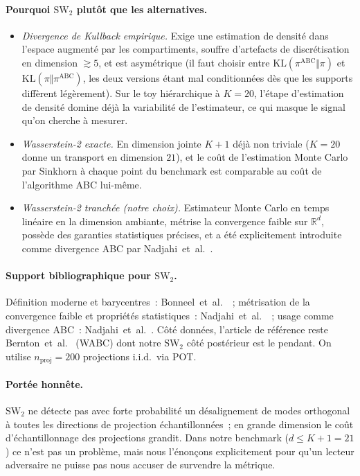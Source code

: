 \documentclass[11pt]{article}
\begin{document}
\paragraph{Pourquoi $\mathrm{SW}_2$ plutôt que les alternatives.}
\begin{itemize}[nosep]
    \item \emph{Divergence de Kullback empirique.} Exige une estimation de densité dans l'espace
    augmenté par les compartiments, souffre d'artefacts de discrétisation en dimension
    $\gtrsim 5$, et est asymétrique (il faut choisir entre $\mathrm{KL}(\pi^{\mathrm{ABC}}\Vert\pi)$
    et $\mathrm{KL}(\pi\Vert\pi^{\mathrm{ABC}})$, les deux versions étant mal conditionnées dès
    que les supports diffèrent légèrement). Sur le toy hiérarchique à $K=20$, l'étape
    d'estimation de densité domine déjà la variabilité de l'estimateur, ce qui masque le signal
    qu'on cherche à mesurer.
    \item \emph{Wasserstein-2 exacte.} En dimension jointe $K+1$ déjà non triviale ($K=20$ donne
    un transport en dimension $21$), et le coût de l'estimation Monte Carlo par Sinkhorn à chaque
    point du benchmark est comparable au coût de l'algorithme ABC lui-même.
    \item \emph{Wasserstein-2 tranchée (notre choix).} Estimateur Monte Carlo en temps linéaire
    en la dimension ambiante, métrise la convergence faible sur $\mathbb R^{d}$, possède des
    garanties statistiques précises, et a été explicitement introduite comme divergence ABC par
    Nadjahi~et~al.~\cite{nadjahi2020approximate}.
\end{itemize}

\paragraph{Support bibliographique pour $\mathrm{SW}_2$.} Définition moderne et barycentres~:
Bonneel~et~al.~\cite{bonneel2015sliced}~; métrisation de la convergence faible et propriétés
statistiques~: Nadjahi~et~al.~\cite{nadjahi2020statistical}~; usage comme divergence ABC~:
Nadjahi~et~al.~\cite{nadjahi2020approximate}. Côté données, l'article de référence reste
Bernton~et~al.~\cite{bernton2019approximate} (WABC) dont notre $\mathrm{SW}_2$ côté postérieur
est le pendant. On utilise $n_{\mathrm{proj}}=200$ projections i.i.d.\ via POT.

\paragraph{Portée honnête.} $\mathrm{SW}_2$ ne détecte pas avec forte probabilité un désalignement
de modes orthogonal à toutes les directions de projection échantillonnées~; en grande dimension
le coût d'échantillonnage des projections grandit. Dans notre benchmark ($d \le K+1 = 21$) ce
n'est pas un problème, mais nous l'énonçons explicitement pour qu'un lecteur adversaire ne puisse
pas nous accuser de survendre la métrique.
\end{document}
